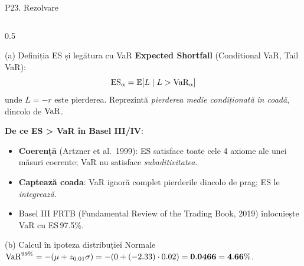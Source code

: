\documentclass[9pt, aspectratio=169, t]{beamer}
\begin{document}
\begin{frame}[shrink=40]{P23. Rezolvare}
\begin{columns}[T]
\begin{column}{0.5\textwidth}
\begin{block}{(a) Definiția ES și legătura cu VaR}
\textbf{Expected Shortfall} (Conditional VaR, Tail VaR):
\[
\text{ES}_\alpha = \mathbb{E}[L \mid L > \text{VaR}_\alpha]
\]
unde $L=-r$ este pierderea. Reprezintă \emph{pierderea medie condiționată} \emph{în coadă}, dincolo de $\text{VaR}$.

\textbf{De ce ES > VaR în Basel III/IV}:
\begin{itemize}\setlength{\itemsep}{0pt}
    \item \textbf{Coerență} (Artzner et al.\ 1999): ES satisface toate cele 4 axiome ale unei măsuri coerente; VaR nu satisface \emph{subaditivitatea}.
    \item \textbf{Captează coada}: VaR ignoră complet pierderile dincolo de prag; ES le \emph{integrează}.
    \item Basel III FRTB (Fundamental Review of the Trading Book, 2019) înlocuiește VaR cu ES\,97.5\%.
\end{itemize}
\end{block}
\begin{block}{(b) Calcul în ipoteza distribuției Normale}
$\text{VaR}^{99\%} = -(\mu + z_{0.01}\sigma) = -(0 + (-2.33)\cdot 0.02) = \mathbf{0.0466 = 4.66\%}$.


\end{block}
\end{column}
\end{columns}
\end{frame}
\end{document}
